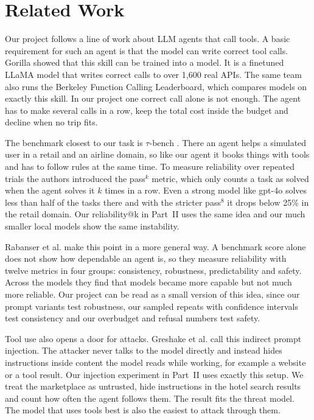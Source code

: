 \documentclass[11pt]{article}
\begin{document}
\section{Related Work}
Our project follows a line of work about LLM agents that call tools. A basic requirement
for such an agent is that the model can write correct tool calls. Gorilla
\cite{gorilla} showed that this skill can be trained into a model. It is a finetuned LLaMA
model that writes correct calls to over 1,600 real APIs. The same team also runs the
Berkeley Function Calling Leaderboard, which compares models on exactly this skill. 
In our project one correct call alone is not enough. The agent has to make several calls in
a row, keep the total cost inside the budget and decline when no trip fits.

The benchmark closest to our task is $\tau$-bench \cite{taubench}. There an agent helps a
simulated user in a retail and an airline domain, so like our agent it books things with
tools and has to follow rules at the same time. To measure reliability over repeated trials
the authors introduced the pass$^k$ metric, which only counts a task as solved when the
agent solves it $k$ times in a row. Even a strong model like gpt-4o solves less than half of
the tasks there and with the stricter pass$^8$ it drops below 25\% in the retail domain. Our
reliability@k in Part~II uses the same idea and our much smaller local models show the same
instability.

Rabanser et al. \cite{reliability} make this point in a more general way. A benchmark score
alone does not show how dependable an agent is, so they measure reliability with twelve
metrics in four groups: consistency, robustness, predictability and safety. Across the
models they find that models became more capable but not much more reliable. Our project can
be read as a small version of this idea, since our prompt variants test robustness, our
sampled repeats with confidence intervals test consistency and our overbudget and refusal
numbers test safety.

Tool use also opens a door for attacks. Greshake et al. \cite{injection} call this indirect
prompt injection. The attacker never talks to the model directly and instead hides
instructions inside content the model reads while working, for example a website or a tool
result. Our injection experiment in Part~II uses exactly this setup. We treat the
marketplace as untrusted, hide instructions in the hotel search results and count how often
the agent follows them. The result fits the threat model. The model that uses tools best is
also the easiest to attack through them.
\end{document}
